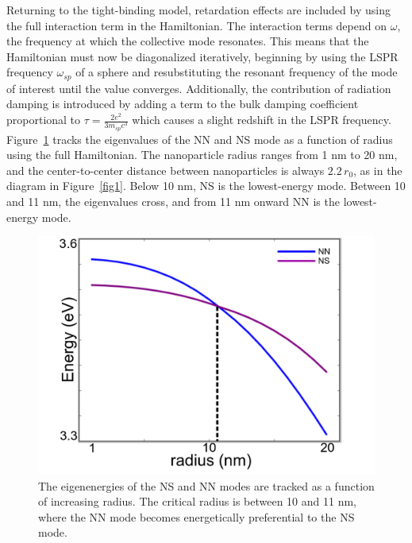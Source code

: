 \documentclass[journal=jpccck,manuscript=article]{achemso}
\begin{document}
Returning to the tight-binding model, retardation effects are included by using the full interaction term in the Hamiltonian. The interaction terms depend on $\omega$, the frequency at which the collective mode resonates. This means that the Hamiltonian must now be diagonalized iteratively, beginning by using the LSPR frequency $\omega_{sp}$ of a sphere and resubstituting the resonant frequency of the mode of interest until the value converges. Additionally, the contribution of radiation damping\cite{vonPlessen2007} is introduced by adding a term to the bulk damping coefficient proportional to $\tau=\frac{2e^2}{3m_{sp}c^3}$ which causes a slight redshift in the LSPR frequency. Figure~\ref{fig5} tracks the eigenvalues of the NN and NS mode as a function of radius using the full Hamiltonian. The nanoparticle radius ranges from 1 nm to 20 nm, and the center-to-center distance between nanoparticles is always $2.2 \, r_0$, as in the diagram in Figure~\ref{fig1}. Below 10 nm, NS is the lowest-energy mode. Between 10 and 11 nm, the eigenvalues cross, and from 11 nm onward NN is the lowest-energy mode.

\begin{figure}
  \begin{center}
  \includegraphics[trim= 0 0 0 0,clip=true,scale=0.3]{nn-ns-eigen_3.png}
  \caption{The eigenenergies of the NS and NN modes are tracked as a function of increasing radius. The critical radius is between 10 and 11 nm, where the NN mode becomes energetically preferential to the NS mode.}
  \label{fig5}
  \end{center}
\end{figure}
\end{document}
